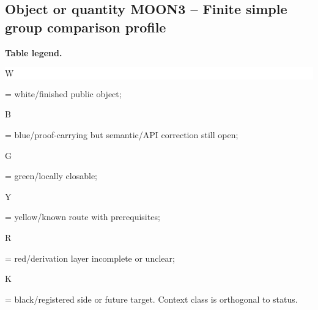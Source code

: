 \subsection*{Object or quantity MOON3 -- Finite simple group comparison profile}
\hypertarget{objproof:MOON3}{}
\par\smallskip\noindent\begin{minipage}{0.99\linewidth}\footnotesize\raggedright\textbf{Table legend.} \colorbox{white}{\strut W} = white/finished public object; \colorbox{cyan!20}{\strut B} = blue/proof-carrying but semantic/API correction still open; \colorbox{green!18}{\strut G} = green/locally closable; \colorbox{yellow!25}{\strut Y} = yellow/known route with prerequisites; \colorbox{red!20}{\strut R} = red/derivation layer incomplete or unclear; \colorbox{black!18}{\strut K} = black/registered side or future target. Context class is orthogonal to status.\end{minipage}\par\vspace{0.25em}
